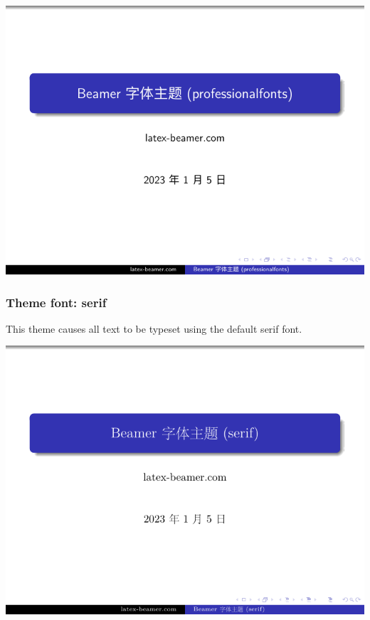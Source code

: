 \includegraphics[page=2]{examples/beamer/font-theme-professionalfonts.pdf}

\subsubsection{Theme font: {\ttfamily serif}}

This theme causes all text to be typeset using the default serif font.

\includegraphics[page=1]{examples/beamer/font-theme-serif.pdf}

